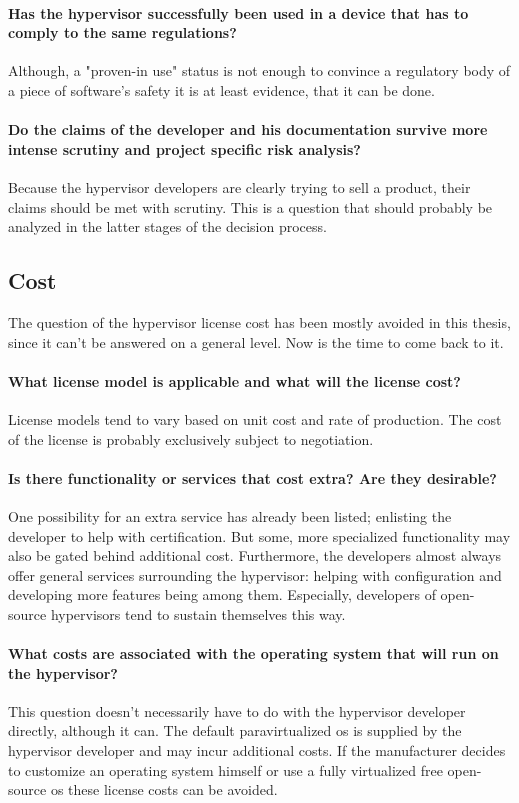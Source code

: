 \paragraph{Has the hypervisor successfully been used in a device that has to comply to the same regulations?}
Although, a "proven-in use" status is not enough to convince a regulatory body of a piece of software's safety it is at least evidence, that it can be done.
\paragraph{Do the claims of the developer and his documentation survive more intense scrutiny and project specific risk analysis?}
Because the hypervisor developers are clearly trying to sell a product, their claims should be met with scrutiny. This is a question that should probably be analyzed in the latter stages of the decision process.
\subsection{Cost}
The question of the hypervisor license cost has been mostly avoided in this thesis, since it can't be answered on a general level. Now is the time to come back to it.
\paragraph{What license model is applicable and what will the license cost?}
License models tend to vary based on unit cost and rate of production.
The cost of the license is probably exclusively subject to negotiation. 
\paragraph{Is there functionality or services that cost extra? Are they desirable?}
One possibility for an extra service has already been listed; enlisting the developer to help with certification. But some, more specialized functionality may also be gated behind additional cost. Furthermore, the developers almost always offer general services surrounding the hypervisor: helping with configuration and developing more features being among them. Especially, developers of open-source hypervisors tend to sustain themselves this way.
\paragraph{What costs are associated with the operating system that will run on the hypervisor?}
This question doesn't necessarily have to do with the hypervisor developer directly, although it can. The default paravirtualized \acrshort{os} is supplied by the hypervisor developer and may incur additional costs. If the manufacturer decides to customize an operating system himself or use a fully virtualized free open-source \acrshort{os} these license costs can be avoided. 
